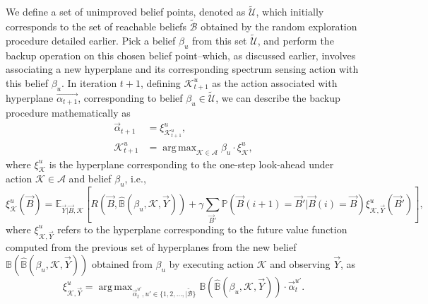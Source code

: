 \documentclass[12pt, draftcls, onecolumn]{IEEEtran}
\DeclareMathOperator*{\argmax}{arg\,max}
\begin{document}
We define a set of unimproved belief points, denoted as $\tilde{\mathcal{U}}$, which initially corresponds to the set of reachable beliefs $\tilde{\mathcal{B}}$ obtained by the random exploration procedure detailed earlier. Pick a belief $\beta_{u}$ from this set $\tilde{\mathcal{U}}$, and perform the backup operation on this chosen belief point--which, as discussed earlier, involves associating a new hyperplane and its corresponding spectrum sensing action with this belief $\beta_{u}$. In iteration $t+1$, defining $\mathcal{K}_{t+1}^{u}$ as the action associated with hyperplane $\vec{\alpha_{t+1}}$, corresponding to belief $\beta_{u}{\in}\tilde{\mathcal{U}}$, we can describe the backup procedure mathematically as
\begin{equation}\label{25}
    \begin{aligned}
        \vec{\alpha}_{t+1}&=\xi_{\mathcal{K}_{t+1}^{u}}^{u},\\
        \mathcal{K}_{t+1}^{u}&=\argmax_{\mathcal{K} \in \mathcal{A}}\beta_{u} \cdot \xi_{\mathcal{K}}^{u},
    \end{aligned}
\end{equation}
where $\xi_{\mathcal{K}}^{u}$ is the hyperplane corresponding to the one-step look-ahead under action $\mathcal{K}{\in}\mathcal{A}$ and belief $\beta_{u}$, i.e.,
\begin{equation}\label{26}
    \xi_{\mathcal{K}}^{u}(\vec{B})=\mathbb{E}_{\vec{Y}|\vec{B},\mathcal{K}}\left[R(\vec{B},\hat{\mathbb{B}}(\beta_{u},\mathcal{K},\vec{Y}))+\gamma \sum_{\vec{B}'}\mathbb{P}(\vec{B}(i+1)=\vec{B}'|\vec{B}(i)=\vec{B})\xi_{\mathcal{K},\vec{Y}}^{u}(\vec{B}')\right],
\end{equation}
where $\xi_{\mathcal{K},\vec{Y}}^{u}$ refers to the hyperplane corresponding to the future value function computed from the previous set of hyperplanes from the new belief $\mathbb{B}(\hat{\mathbb{B}}(\beta_{u},\mathcal{K},\vec{Y}))$ obtained from $\beta_{u}$ by executing action $\mathcal{K}$ and observing $\vec{Y}$, as
\begin{equation}\label{27}
    \xi_{\mathcal{K},\vec{Y}}^{u}=\argmax_{\vec{\alpha}_{t}^{u'},u' \in \{1,2,\dots,|\tilde{\mathcal{B}}\}}\mathbb{B}(\hat{\mathbb{B}}(\beta_{u},\mathcal{K},\vec{Y})) \cdot \vec{\alpha}_{t}^{u'}.
\end{equation}
\end{document}
